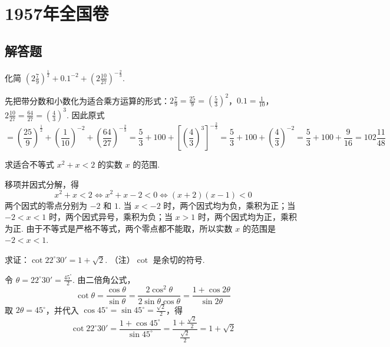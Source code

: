 \documentclass[UTF8,a4paper,oneside,11pt]{ctexbook}
\begin{document}
\mainmatter

\chapter{1957年全国卷}

\section{解答题}

\begin{problem}
化简 \(\left(2\frac{7}{9}\right)^{\frac{1}{2}}+0.1^{-2}+\left(2\frac{10}{27}\right)^{-\frac{2}{3}}\).
\end{problem}

\begin{solution}
先把带分数和小数化为适合乘方运算的形式：\(2\frac{7}{9}=\frac{25}{9}=\left(\frac{5}{3}\right)^2\)，\(0.1=\frac{1}{10}\)，\(2\frac{10}{27}=\frac{64}{27}=\left(\frac{4}{3}\right)^3\).
因此原式
\[
=\left(\frac{25}{9}\right)^{\frac{1}{2}}+\left(\frac{1}{10}\right)^{-2}+\left(\frac{64}{27}\right)^{-\frac{2}{3}}
=\frac{5}{3}+100+\left[\left(\frac{4}{3}\right)^3\right]^{-\frac{2}{3}}
=\frac{5}{3}+100+\left(\frac{4}{3}\right)^{-2}
=\frac{5}{3}+100+\frac{9}{16}
=102\frac{11}{48}
\]
\end{solution}

\begin{problem}
求适合不等式 \(x^{2}+x<2\) 的实数 \(x\) 的范围.
\end{problem}

\begin{solution}
移项并因式分解，得
\[
x^{2}+x<2\Longleftrightarrow x^{2}+x-2<0\Longleftrightarrow (x+2)(x-1)<0
\]
两个因式的零点分别为 \(-2\) 和 \(1\). 当 \(x<-2\) 时，两个因式均为负，乘积为正；当 \(-2<x<1\) 时，两个因式异号，乘积为负；当 \(x>1\) 时，两个因式均为正，乘积为正. 由于不等式是严格不等式，两个零点都不能取，所以实数 \(x\) 的范围是 \(-2<x<1\).
\end{solution}

\begin{problem}
求证：\(\cot22^{\circ}30'=1+\sqrt2\). （注）\(\cot\) 是余切的符号.
\end{problem}

\begin{solution}
令 \(\theta=22^{\circ}30'=\frac{45^{\circ}}{2}\). 由二倍角公式，
\[
\cot\theta=\frac{\cos\theta}{\sin\theta}=\frac{2\cos^2\theta}{2\sin\theta\cos\theta}=\frac{1+\cos2\theta}{\sin2\theta}
\]
取 \(2\theta=45^{\circ}\)，并代入 \(\cos45^{\circ}=\sin45^{\circ}=\frac{\sqrt2}{2}\)，得
\[
\cot22^{\circ}30'=\frac{1+\cos45^{\circ}}{\sin45^{\circ}}=\frac{1+\frac{\sqrt2}{2}}{\frac{\sqrt2}{2}}=1+\sqrt2
\]
\end{solution}
\end{document}
